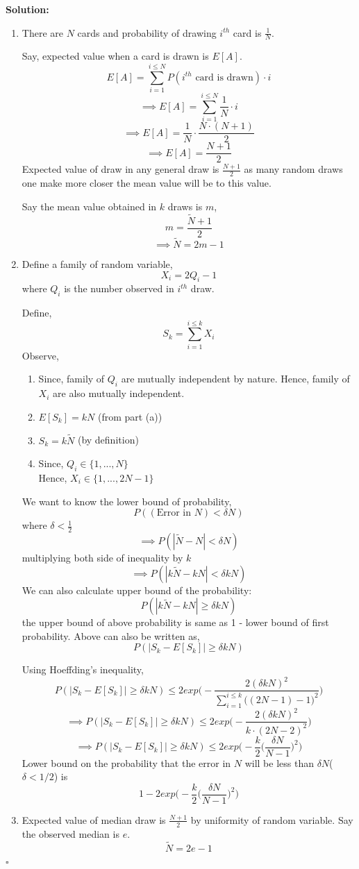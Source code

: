 \documentclass[10pt]{article}
\newenvironment{solution}{\textbf{Solution:}}{\hfill$\square$}
\begin{document}
\begin{enumerate}
\begin{solution}
\begin{enumerate}
\item
There are $N$ cards and probability of drawing $i^{th}$ card is $\frac{1}{N}$. \par
Say, expected value when a card is drawn is $E[A]$.
$$E[A] = \sum_{i=1}^{i \leq N} P(i^{th}\text{ card is drawn}) \cdot i$$
$$\implies E[A] = \sum_{i=1}^{i \leq N} \frac{1}{N} \cdot i$$
$$\implies E[A] = \frac{1}{N} \cdot \frac{N \cdot (N+1)}{2}$$
$$\implies E[A] = \frac{N+1}{2}$$
Expected value of draw in any general draw is $\frac{N+1}{2}$ as many random draws one make more closer the mean value will be to this value. \par
Say the mean value obtained in $k$ draws is $m$,
$$m = \frac{\tilde{N}+1}{2}$$
$$\implies \tilde{N} = 2m -1 $$
\item
Define a family of random variable,
$$X_{i} = 2Q_{i} - 1$$ where $Q_{i}$ is the number observed in $i^{th}$ draw. \par
Define,
$$S_{k} = \sum_{i=1}^{i\leq k} X_{i}$$
Observe, 
\begin{enumerate}
    \item Since, family of $Q_{i}$ are mutually independent by nature. Hence, family of $X_{i}$ are also mutually independent.
    \item $E[S_{k}] = kN$ (from part (a))
    \item $S_{k} = k\tilde{N}$ (by definition)
    \item Since, $Q_{i} \in \{1,...,N\}$ \\ Hence, $X_{i} \in \{1,...,2N-1\}$
\end{enumerate}
We want to know the lower bound of probability,
$$P((\text{Error in } N) < \delta N)$$ where $\delta < \tfrac{1}{2}$
$$\implies P(|\tilde{N} - N| < \delta N)$$ multiplying both side of inequality by $k$
$$\implies P(|k\tilde{N} - kN| < \delta kN)$$ 
We can also calculate upper bound of the probability:
$$P(|k\tilde{N} - kN| \geq \delta kN)$$ 
the upper bound of above probability is same as 1 - lower bound of first probability. Above can also be written as,
$$P(|S_{k} - E[S_{k}]| \geq \delta kN)$$ 
\par
Using Hoeffding's inequality,
$$P(|S_{k} - E[S_{k}]| \geq \delta kN) \leq 2exp \Bigg(-\frac{2 (\delta kN)^2}{\sum_{i=1}^{i\leq k}\big((2N -1) -1 \big)^2} \Bigg)$$ 
$$\implies P(|S_{k} - E[S_{k}]| \geq \delta kN) \leq 2exp \Bigg(-\frac{2 (\delta kN)^2}{k \cdot(2N -2)^2} \Bigg)$$ 
$$\implies P(|S_{k} - E[S_{k}]| \geq \delta kN) \leq 2exp \Bigg(-\frac{k}{2} \Big(\frac{\delta N}{N -1}\Big)^2 \Bigg)$$ 
Lower bound on the probability that the error in $N$ will be less than $\delta N$($\delta<1/2$) is $$1- 2exp \Bigg(-\frac{k}{2} \Big(\frac{\delta N}{N -1}\Big)^2 \Bigg)$$ 
\item Expected value of median draw is $\frac{N+1}{2}$ by uniformity of random variable.
Say the observed median is $e$.
$$\tilde{N} = 2e-1$$


\end{enumerate}
\end{solution}
\end{enumerate}
\end{document}
